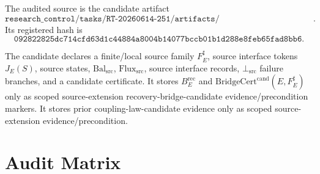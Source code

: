 \documentclass[11pt]{article}
\newcommand{\BErec}{B_E^{\mathrm{rec}}}
\newcommand{\BridgeCertCand}{\mathrm{BridgeCert}^{\mathrm{cand}}}
\newcommand{\BalSrc}{\mathrm{Bal}_{\mathrm{src}}}
\newcommand{\FluxSrc}{\mathrm{Flux}_{\mathrm{src}}}
\newcommand{\BottomSrc}{\bot_{\mathrm{src}}}
\begin{document}
The audited source is the candidate artifact
\[
  \texttt{research\_control/tasks/RT-20260614-251/artifacts/280\_...\_STRESS\_ENERGY\_INTERFACE\_CANDIDATE.tex}.
\]
Its registered hash is
\[
  \texttt{092822825dc714cfd63d1c44884a8004b14077bccb01b1d288e8feb65fad8bb6}.
\]

The candidate declares a finite/local source family \(F_E^\sharp\), source
interface tokens \(J_E(S)\), source states, \(\BalSrc\), \(\FluxSrc\), source
interface records, \(\BottomSrc\) failure branches, and a candidate
certificate. It stores \(\BErec\) and \(\BridgeCertCand(E,F_E^\sharp)\) only
as scoped source-extension recovery-bridge-candidate evidence/precondition
markers. It stores prior coupling-law-candidate evidence only as scoped
source-extension evidence/precondition.

\section{Audit Matrix}
\end{document}
